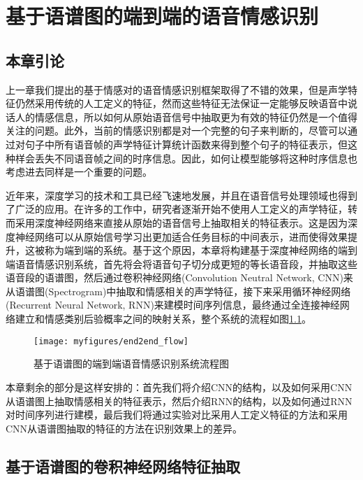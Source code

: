 \chapter{基于语谱图的端到端的语音情感识别}
\label{cha:end2end}

\section{本章引论}
\label{sec:end2end_intro}

上一章我们提出的基于情感对的语音情感识别框架取得了不错的效果，但是声学特征仍然采用传统的人工定义的特征，然而这些特征无法保证一定能够反映语音中说话人的情感信息，所以如何从原始语音信号中抽取更为有效的特征仍然是一个值得关注的问题。此外，当前的情感识别都是对一个完整的句子来判断的，尽管可以通过对句子中所有语音帧的声学特征计算统计函数来得到整个句子的特征表示，但这种样会丢失不同语音帧之间的时序信息。因此，如何让模型能够将这种时序信息也考虑进去同样是一个重要的问题。

近年来，深度学习的技术和工具已经飞速地发展，并且在语音信号处理领域也得到了广泛的应用。在许多的工作中，研究者逐渐开始不使用人工定义的声学特征，转而采用深度神经网络来直接从原始的语音信号上抽取相关的特征表示。这是因为深度神经网络可以从原始信号学习出更加适合任务目标的中间表示，进而使得效果提升，这被称为端到端的系统。基于这个原因，本章将构建基于深度神经网络的端到端语音情感识别系统，首先将会将语音句子切分成更短的等长语音段，并抽取这些语音段的语谱图，然后通过卷积神经网络(Convolution Neutral Network, CNN)来从语谱图(Spectrogram)中抽取和情感相关的声学特征，接下来采用循环神经网络(Recurrent Neural Network, RNN)来建模时间序列信息，最终通过全连接神经网络建立和情感类别后验概率之间的映射关系，整个系统的流程如图\ref{fig:end2end_flow}。

\begin{figure}[htb] %
    \centering
    \texttt{[image: myfigures/end2end\_flow]}
    \caption{基于语谱图的端到端语音情感识别系统流程图}
    \label{fig:end2end_flow}
\end{figure}

本章剩余的部分是这样安排的：首先我们将介绍CNN的结构，以及如何采用CNN从语谱图上抽取情感相关的特征表示，然后介绍RNN的结构，以及如何通过RNN对时间序列进行建模，最后我们将通过实验对比采用人工定义特征的方法和采用CNN从语谱图抽取的特征的方法在识别效果上的差异。

\section{基于语谱图的卷积神经网络特征抽取}
\label{sec:cnn_spectrogram_feature}

